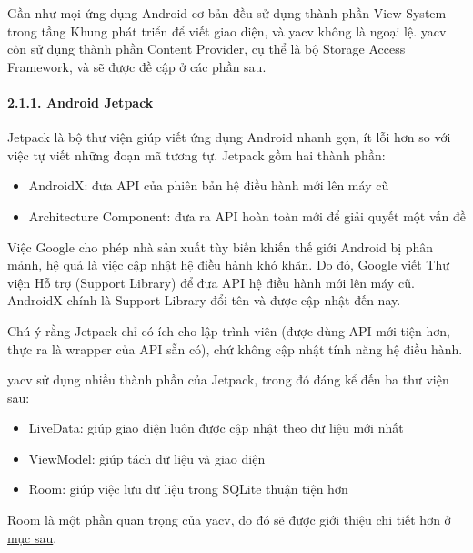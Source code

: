 Gần như mọi ứng dụng Android cơ bản đều sử dụng thành phần View System
trong tầng Khung phát triển để viết giao diện, và yacv không là ngoại
lệ. yacv còn sử dụng thành phần Content Provider, cụ thể là bộ Storage
Access Framework, và sẽ được đề cập ở các phần sau.

\hypertarget{android-jetpack}{%
  \paragraph{\texorpdfstring{2.1.1. Android Jetpack
    }{2.1.1. Android Jetpack }}\label{android-jetpack}}

Jetpack là bộ thư viện giúp viết ứng dụng Android nhanh gọn, ít lỗi hơn
so với việc tự viết những đoạn mã tương tự. Jetpack gồm hai thành phần:

\begin{itemize}
  
  \item
        AndroidX: đưa API của phiên bản hệ điều hành mới lên máy cũ
  \item
        Architecture Component: đưa ra API hoàn toàn mới để giải quyết một vấn
        đề
\end{itemize}

Việc Google cho phép nhà sản xuất tùy biến khiến thế giới Android bị phân mảnh,
hệ quả là việc cập nhật hệ điều hành khó khăn. Do đó, Google viết Thư viện Hỗ
trợ (Support Library) để đưa API hệ điều hành mới lên máy cũ. AndroidX chính là
Support Library đổi tên và được cập nhật đến nay.

Chú ý rằng Jetpack chỉ có ích cho lập trình viên (được dùng API mới tiện
hơn, thực ra là wrapper của API sẵn có), chứ không cập nhật tính năng hệ
điều hành.

yacv sử dụng nhiều thành phần của Jetpack, trong đó đáng kể đến ba thư
viện sau:

\begin{itemize}
  
  \item
        LiveData: giúp giao diện luôn được cập nhật theo dữ liệu mới nhất
  \item
        ViewModel: giúp tách dữ liệu và giao diện
  \item
        Room: giúp việc lưu dữ liệu trong SQLite thuận tiện hơn
\end{itemize}

Room là một phần quan trọng của yacv, do đó sẽ được giới thiệu chi tiết
hơn ở \protect\hyperlink{P2.4.2-room}{mục sau}.

